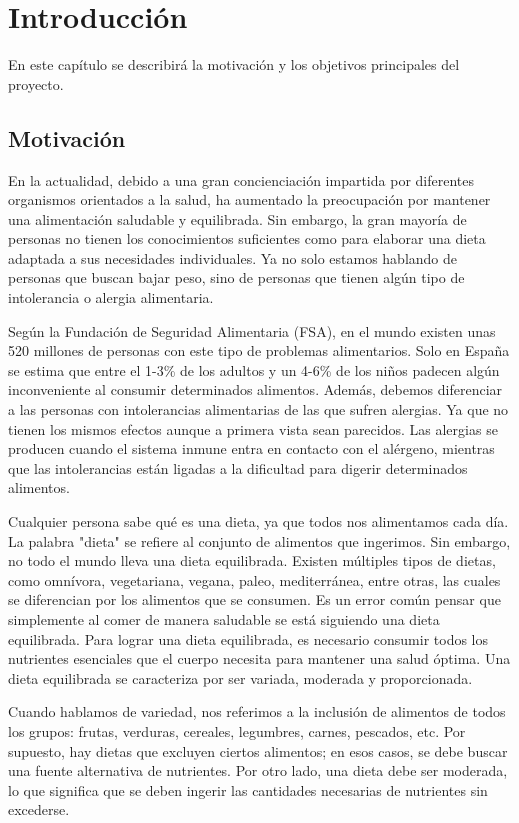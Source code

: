 \chapter{Introducción}
En este capítulo se describirá la motivación y los objetivos principales del proyecto.

\section{Motivación}
En la actualidad, debido a una gran concienciación impartida por diferentes organismos orientados a la salud, ha aumentado la preocupación por mantener una alimentación saludable y equilibrada. Sin embargo, la gran mayoría de personas no tienen los conocimientos suficientes como para elaborar una dieta adaptada a sus necesidades individuales. Ya no solo estamos hablando de personas que buscan bajar peso, sino de personas que tienen algún tipo de intolerancia o alergia alimentaria.

Según la Fundación de Seguridad Alimentaria (FSA), en el mundo existen unas 520 millones de personas con este tipo de problemas alimentarios. Solo en España se estima que entre el 1-3\% de los adultos y un 4-6\% de los niños padecen algún inconveniente al consumir determinados alimentos. Además, debemos diferenciar a las personas con intolerancias alimentarias de las que sufren alergias. Ya que no tienen los mismos efectos aunque a primera vista sean parecidos. Las alergias se producen cuando el sistema inmune entra en contacto con el alérgeno, mientras que las intolerancias están ligadas a la dificultad para digerir determinados alimentos.\cite{FSA}

Cualquier persona sabe qué es una dieta, ya que todos nos alimentamos cada día. La palabra "dieta" se refiere al conjunto de alimentos que ingerimos. Sin embargo, no todo el mundo lleva una dieta equilibrada. Existen múltiples tipos de dietas, como omnívora, vegetariana, vegana, paleo, mediterránea, entre otras, las cuales se diferencian por los alimentos que se consumen.
Es un error común pensar que simplemente al comer de manera saludable se está siguiendo una dieta equilibrada. Para lograr una dieta equilibrada, es necesario consumir todos los nutrientes esenciales que el cuerpo necesita para mantener una salud óptima. Una dieta equilibrada se caracteriza por ser variada, moderada y proporcionada.

Cuando hablamos de variedad, nos referimos a la inclusión de alimentos de todos los grupos: frutas, verduras, cereales, legumbres, carnes, pescados, etc. Por supuesto, hay dietas que excluyen ciertos alimentos; en esos casos, se debe buscar una fuente alternativa de nutrientes. Por otro lado, una dieta debe ser moderada, lo que significa que se deben ingerir las cantidades necesarias de nutrientes sin excederse.

